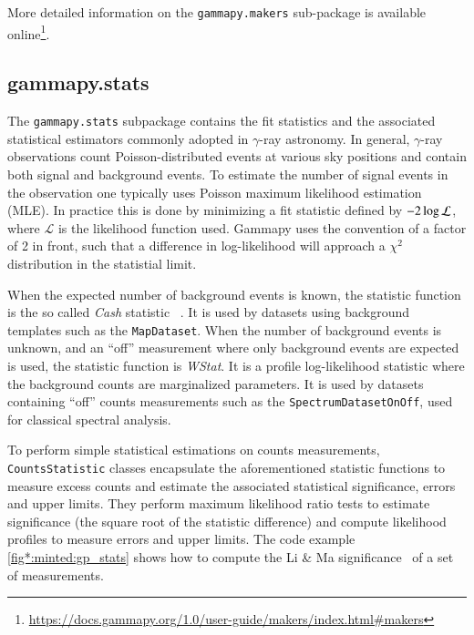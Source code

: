 \documentclass[longauth]{aa}
\newcommand{\code}[1]{\texttt{#1}}
\newcommand{\gammapy}{Gammapy\xspace}
\newcommand{\gammaray}{$\gamma$-ray\xspace}
\begin{document}
More detailed information on the \code{gammapy.makers} sub-package is available online\footnote{\url{https://docs.gammapy.org/1.0/user-guide/makers/index.html\#makers}}.


\subsection{gammapy.stats}
\label{ssec:gammapy-stats}
The \code{gammapy.stats} subpackage contains the fit statistics and the associated
statistical estimators commonly adopted in \gammaray astronomy. In
general, \gammaray observations count Poisson-distributed events at various sky
positions and contain both signal and background events.
To estimate the number of signal events in the observation one typically uses
Poisson maximum likelihood estimation (MLE). In practice this is done
by minimizing a fit statistic defined by $-2 \time\cdot \log{\mathcal{L}}$,
where $\mathcal{L}$ is the likelihood function used. \gammapy uses the convention
of a factor of 2 in front, such that a difference in log-likelihood will
approach a $\chi^2$ distribution in the statistial limit.

When the expected number of background events is known, the statistic function 
is the so called \emph{Cash} statistic ~\citep{Cash}. It is used by datasets using background
templates such as the
\code{MapDataset}. When the number of background events is unknown, and an \enquote{off}
measurement where only background events are expected is used, the statistic
function is \emph{WStat}. It is a profile log-likelihood statistic where the background
counts are marginalized parameters. It is used by datasets containing \enquote{off}
counts measurements such as the \code{SpectrumDatasetOnOff}, used for classical
spectral analysis.

To perform simple statistical estimations on counts measurements,
\code{CountsStatistic} classes encapsulate the aforementioned statistic functions to
measure excess counts and estimate the associated statistical significance,
errors and upper limits. They perform maximum likelihood ratio tests to
estimate significance (the square root of the statistic difference) and compute
likelihood profiles to measure errors and upper limits. The code example
\ref{fig*:minted:gp_stats} shows how to compute the Li \& Ma
significance~\citep{LiMa} of a set of measurements.
\end{document}
